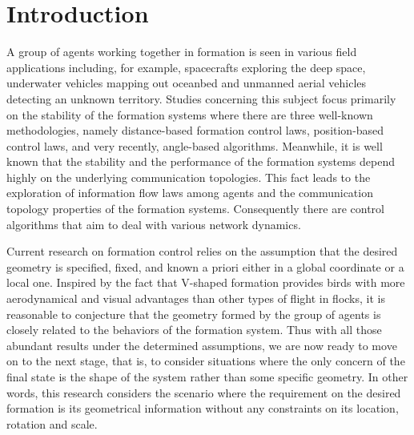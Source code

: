 \documentclass[times]{rncauth}
\begin{document}
\vspace{-6pt}







\section{Introduction}
\vspace{-2pt}
 A group of agents working together in formation is
seen in various field applications including, for example,
spacecrafts exploring the deep space, underwater vehicles mapping
out oceanbed and unmanned aerial vehicles detecting an unknown
territory. Studies concerning this subject focus primarily on the
stability of the formation systems where there are three  well-known
methodologies, namely distance-based formation control
laws\cite{Anderson07threeForm,Dimarogonas08distanceFormation},
position-based control
laws\cite{Yu09minimalPersistent,Krick09infinitesimallyRigid,Ren08distributed},
and very recently, angle-based
algorithms\cite{Moshtagh09visionFormationBearing,Basiri10angleonly}.
Meanwhile, it is well known that the stability and the performance
of the formation systems depend highly on the underlying
communication topologies. This fact leads to the exploration of
information flow laws among
agents\cite{Fax04,Olfati04consensusSwitching} and  the communication
topology properties of the formation
systems\cite{Anderson08rigidMagazine,Olfati02rigidity}. Consequently
there are control algorithms that aim to deal with various network
dynamics\cite{Olfati04consensusSwitching,Luke09formationDelay,Secchi08formationDelay}.


Current research on formation control relies on the assumption that
the desired geometry is specified, fixed, and known a
priori either in a global coordinate or a local one. Inspired by the
fact that V-shaped formation provides birds with more aerodynamical and visual
advantages than other types of flight in
flocks\cite{Nature01Vformation}, it is reasonable to conjecture that
the geometry formed by the group of agents is closely related to the
behaviors of the formation system. Thus with all those abundant
results under the determined assumptions, we are now ready to move
on to the next stage, that is, to consider situations where the only
concern of the final state is the shape of the system rather than some specific geometry.
In other words, this research considers the scenario where the
requirement on the desired formation is its geometrical information
without any constraints on its location, rotation and scale.
\end{document}
